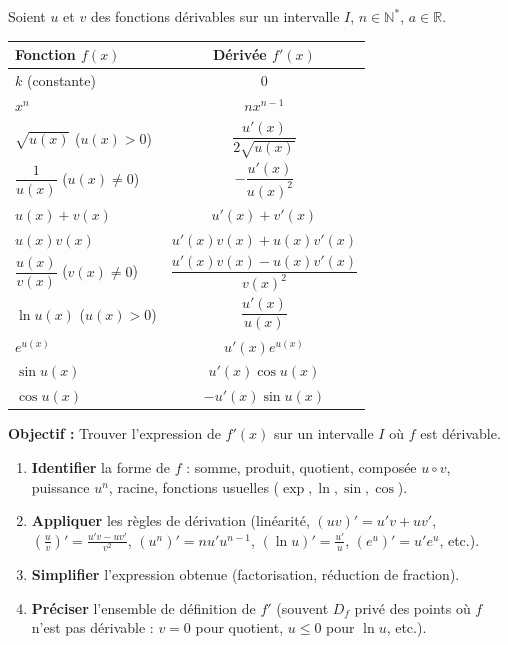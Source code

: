 \documentclass[11pt]{article}
\begin{document}
\begin{propriete}
Soient $u$ et $v$ des fonctions dérivables sur un intervalle $I$, $n \in \mathbb{N}^*$, $a \in \mathbb{R}$.
\begin{center}
\begin{tabular}{|l|c|}\hline
\textbf{Fonction $f(x)$} & \textbf{Dérivée $f'(x)$} \\ \hline
$k$ (constante) & $0$ \\ \hline
$x^n$ & $n x^{n-1}$ \\ \hline
$\sqrt{u(x)}$ ($u(x)>0$) & $\dfrac{u'(x)}{2\sqrt{u(x)}}$ \\ \hline
$\dfrac{1}{u(x)}$ ($u(x)\neq 0$) & $-\dfrac{u'(x)}{u(x)^2}$ \\ \hline
$u(x) + v(x)$ & $u'(x) + v'(x)$ \\ \hline
$u(x) v(x)$ & $u'(x)v(x) + u(x)v'(x)$ \\ \hline
$\dfrac{u(x)}{v(x)}$ ($v(x)\neq 0$) & $\dfrac{u'(x)v(x) - u(x)v'(x)}{v(x)^2}$ \\ \hline
$\ln u(x)$ ($u(x)>0$) & $\dfrac{u'(x)}{u(x)}$ \\ \hline
$e^{u(x)}$ & $u'(x) e^{u(x)}$ \\ \hline
$\sin u(x)$ & $u'(x) \cos u(x)$ \\ \hline
$\cos u(x)$ & $-u'(x) \sin u(x)$ \\ \hline
\end{tabular}
\end{center}
\end{propriete}

\begin{methode}
\textbf{Objectif :} Trouver l'expression de $f'(x)$ sur un intervalle $I$ où $f$ est dérivable.
\begin{enumerate}
    \item \textbf{Identifier} la forme de $f$ : somme, produit, quotient, composée $u \circ v$, puissance $u^n$, racine, fonctions usuelles ($\exp, \ln, \sin, \cos$).
    \item \textbf{Appliquer} les règles de dérivation (linéarité, $(uv)'=u'v+uv'$, $\left(\frac{u}{v}\right)'=\frac{u'v-uv'}{v^2}$, $(u^n)'=n u' u^{n-1}$, $(\ln u)'=\frac{u'}{u}$, $(e^u)'=u'e^u$, etc.).
    \item \textbf{Simplifier} l'expression obtenue (factorisation, réduction de fraction).
    \item \textbf{Préciser} l'ensemble de définition de $f'$ (souvent $D_f$ privé des points où $f$ n'est pas dérivable : $v=0$ pour quotient, $u \le 0$ pour $\ln u$, etc.).
\end{enumerate}
\end{methode}
\end{document}
